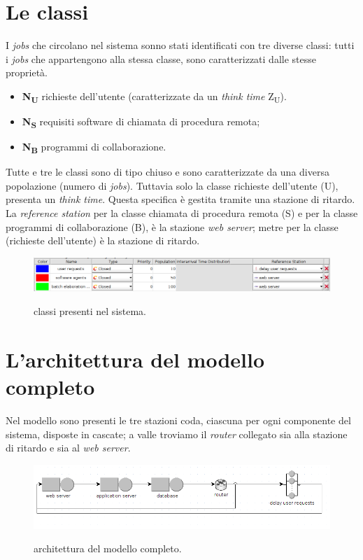 \documentclass[../main.tex]{subfiles}
\begin{document}
    \section{Le classi}\label{sec:le-classi}
    I \textit{jobs} che circolano nel sistema sonno stati identificati con tre diverse classi: tutti i \textit{jobs}
    che appartengono alla stessa classe, sono caratterizzati dalle stesse proprietà.
    \begin{itemize}
        \item \textbf{N\textsubscript{U}} richieste dell'utente (caratterizzate da un \textit{think time} Z\textsubscript{U}).
        \item \textbf{N\textsubscript{S}} requisiti software di chiamata di procedura remota;
        \item \textbf{N\textsubscript{B}} programmi di collaborazione.
    \end{itemize}
    Tutte e tre le classi sono di tipo chiuso e sono caratterizzate da una diversa popolazione (numero di \textit{jobs}).
    Tuttavia solo la classe richieste dell'utente (U), presenta un \textit{think time}. Questa specifica è gestita
    tramite una stazione di ritardo.
    La \textit{reference station} per la classe chiamata di procedura remota (S) e per la classe programmi di collaborazione
    (B), è la stazione \textit{web server}; metre per la classe (richieste dell'utente) è la stazione di ritardo.
    \begin{figure}[H]
        \centering
        \includegraphics[scale = 0.5]{assets/classes.png}\\
        \caption[\textit{Classi} del sistema]{classi presenti nel sistema.}
        \label{fig:clssi-del-sistema}
    \end{figure}


    \section{L'architettura del modello completo}\label{sec:l'architettura-del-modello-completo}
    Nel modello sono presenti le tre stazioni coda, ciascuna per ogni componente del sistema, disposte in cascate;
    a valle troviamo il \textit{router} collegato sia alla stazione di ritardo e sia al \textit{web server}.

    \begin{figure}[H]
        \centering
        \includegraphics[scale = 0.6]{assets/modello_jsim}\\
        \caption[\textit{Architettura} del modello]{architettura del modello completo.}
        \label{fig:architettura-del-modello-completo}
    \end{figure}
\end{document}
